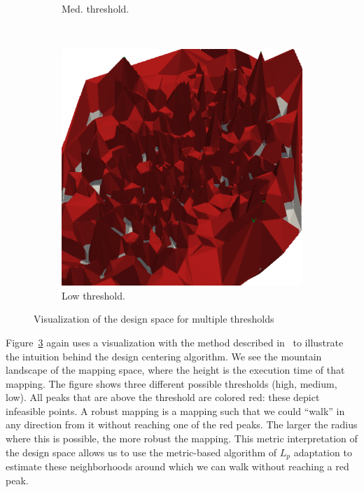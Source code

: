 \begin{figure}[t]
\begin{subfigure}[b]{0.33\textwidth}
		\caption{Med. threshold.}
		\label{fig:lvars-bench-overhead}
	\end{subfigure}
	~
	\begin{subfigure}[b]{0.33\textwidth}
    \includegraphics[width=\textwidth]{figures/coolidge-af-low-threshold.png}
		\caption{Low threshold.}
		\label{fig:lvars-bench-peak}
	\end{subfigure}

	\caption{Visualization of the design space for multiple thresholds}%
	\label{fig:visualization_design_centering_spaces}
\end{figure}

Figure~\ref{fig:visualization_design_centering_spaces} again uses a visualization with the method described in~\cite{visualloss} to illustrate the intuition behind the design centering algorithm.
We see the mountain landscape of the mapping space, where the height is the execution time of that mapping.
The figure shows three different possible thresholds (high, medium, low). All peaks that are above the threshold are colored red: these depict infeasible points.
A robust mapping is a mapping such that we could ``walk'' in any direction from it without reaching one of the red peaks.
The larger the radius where this is possible, the more robust the mapping.
This metric interpretation of the design space allows us to use the metric-based algorithm of $L_p$ adaptation to estimate these neighborhoods around which we can walk without reaching a red peak.

